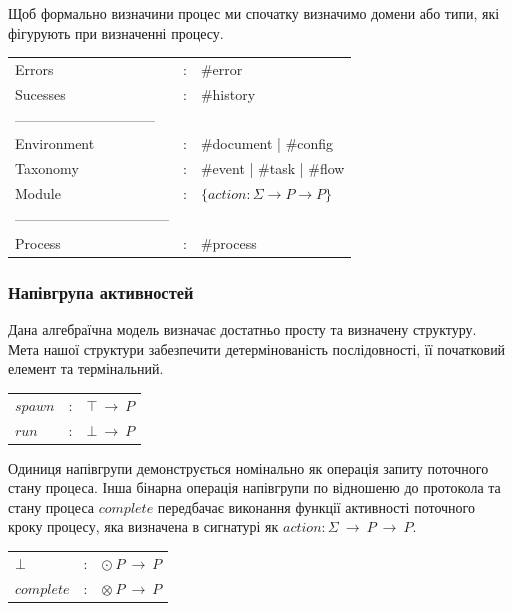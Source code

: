\documentclass[11pt,oneside]{article}
\begin{document}
   Щоб формально визначини процес ми спочатку визначимо домени або типи,
   які фігурують при визначенні процесу.


\begin{center}
\begin{tabular}{lcl}
                Errors &:& \#error\\
              Sucesses &:& \#history\\
        ------------------------------\\
           Environment &:& \#document | \#config\\
              Taxonomy &:& \#event    | \#task   | \#flow\\
                Module &:& $\{ action : \Sigma \rightarrow P \rightarrow P \}$\\
        ---------------------------------\\
               Process &:& \#process\\
\end{tabular}
\end{center}

\newpage
  \subsubsection*{Напівгрупа активностей}

  Дана алгебраїчна модель визначає достатньо просту та визначену структуру.
  Мета нашої структури забезпечити детермінованість послідовності,
  її початковий елемент та термінальний. 

\begin{center}
\begin{tabular}{lcl}
$spawn$       &:& $\top\ \rightarrow\ P$\\
$run$         &:& $\bot\ \rightarrow\ P$\\
\end{tabular}
\end{center}

  Одиниця напівгрупи
  демонструється номінально як операція запиту поточного стану процеса.
  Інша бінарна операція напівгрупи по відношеню до протокола та стану процеса $complete$
  передбачає виконання функції активності поточного кроку процесу, яка
  визначена в сигнатурі як $action: \Sigma\ \rightarrow\ P\ \rightarrow\ P$.

\begin{center}
\begin{tabular}{lcl}
$\bot$        &:& $\odot\ P\ \rightarrow\ P$\\
$complete$    &:& $\otimes\ P\ \rightarrow\ P$\\
\end{tabular}
\end{center}
\end{document}
